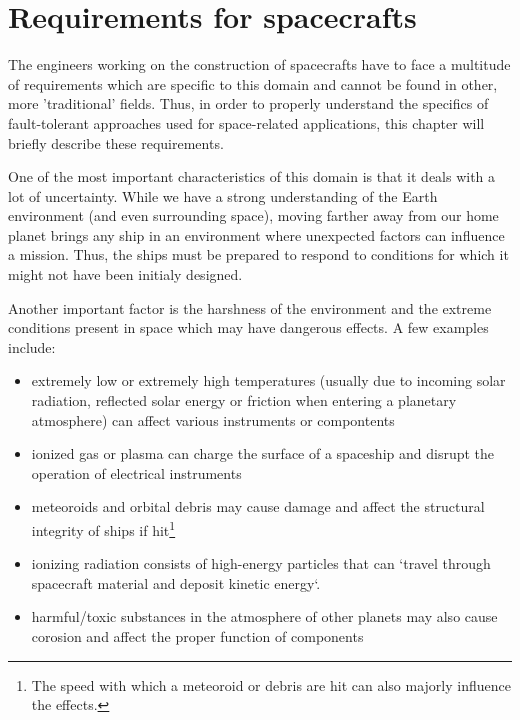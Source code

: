 \section{Requirements for spacecrafts}
The engineers working on the construction of spacecrafts have to face a
multitude of requirements which are specific to this domain and cannot be found
in other, more 'traditional' fields. Thus, in order to properly understand the
specifics of fault-tolerant approaches used for space-related applications, this
chapter will briefly describe these requirements.

One of the most important characteristics of this domain is that it deals with a
lot of uncertainty. While we have a strong understanding of the Earth
environment (and even surrounding space), moving farther away from our home
planet brings any ship in an environment where unexpected factors can influence
a mission. Thus, the ships must be prepared to respond to conditions for which
it might not have been initialy designed.

Another important factor is the harshness of the environment and the extreme
conditions present in space which may have dangerous effects. A few examples
include\cite{req-space-environment}:
\begin{itemize}
  \item extremely low or extremely high temperatures (usually due to incoming
  solar radiation, reflected solar energy or friction when entering a planetary
  atmosphere) can affect various instruments or compontents
  \item ionized gas or plasma can charge the surface of a spaceship and
  disrupt the operation of electrical instruments
  \item meteoroids and orbital debris may cause damage and affect the structural
  integrity of ships if hit\footnote{The speed with which a meteoroid or debris
  are hit can also majorly influence the effects.}
  \item ionizing radiation consists of high-energy particles that can `travel
  through spacecraft material and deposit kinetic energy`.
  \item harmful/toxic substances in the atmosphere of other planets may also
  cause corosion and affect the proper function of components
\end{itemize}

